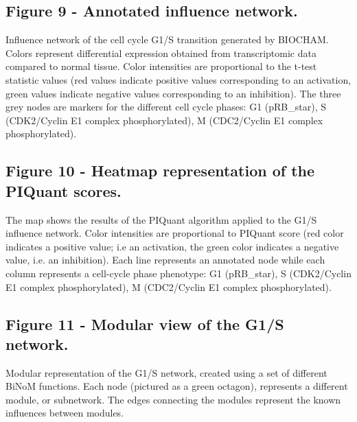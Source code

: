 \documentclass[10pt]{bmc_article}
\newenvironment{bmcformat}{\baselineskip20pt\sloppy\setboolean{publ}{false}}{\baselineskip20pt\sloppy}
\begin{document}
\begin{bmcformat}
  \subsection*{Figure 9 - Annotated influence network.}
Influence network of the cell cycle G1/S transition generated by BIOCHAM. Colors represent differential
expression obtained from transcriptomic data compared to normal tissue. Color
intensities are proportional to the t-test statistic values (red values indicate
positive values corresponding to an activation, green values indicate negative
values corresponding to an inhibition). The three grey nodes are markers for the
different cell cycle phases: G1 (pRB\_star), S (CDK2/Cyclin E1 complex phosphorylated), M (CDC2/Cyclin E1 complex phosphorylated).

  \subsection*{Figure 10 - Heatmap representation of the PIQuant scores.}
The map shows the results of the PIQuant algorithm applied to the G1/S
influence network. Color intensities are proportional to PIQuant score (red color indicates a positive
value; i.e an activation, the green color indicates a negative value, i.e. an
inhibition).
Each line represents an annotated node while each column represents a cell-cycle
phase phenotype: G1 (pRB\_star), S (CDK2/Cyclin E1 complex phosphorylated), M (CDC2/Cyclin E1 complex phosphorylated).

  \subsection*{Figure 11 - Modular view of the G1/S network.}
Modular representation of the G1/S network, created using a set of
different BiNoM functions. Each node (pictured as a green octagon), represents a
different module, or subnetwork. The edges connecting the modules represent the
 known influences between modules.




\end{bmcformat}
\end{document}
